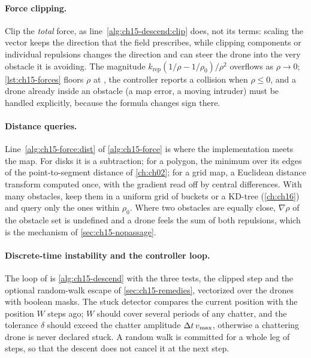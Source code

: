 \paragraph{Force clipping.}
Clip the \emph{total} force, as line~\ref{alg:ch15-descend:clip} does, not
its terms: scaling the vector keeps the direction that the field
prescribes, while clipping components or individual repulsions changes the
direction and can steer the drone into the very obstacle it is avoiding.
The magnitude $k_{\mathrm{rep}}(1/\rho - 1/\rho_0)/\rho^2$ overflows as
$\rho \to 0$; \cref{lst:ch15-forces} floors $\rho$ at , the
controller reports a collision when $\rho \le 0$, and a drone already inside
an obstacle (a map error, a moving intruder) must be handled explicitly,
because the formula changes sign there.

\paragraph{Distance queries.}
Line~\ref{alg:ch15-force:dist} of \cref{alg:ch15-force} is where the
implementation meets the map. For disks it is a subtraction; for a polygon,
the minimum over its edges of the point-to-segment distance of
\cref{ch:ch02}; for a grid map, a Euclidean distance transform computed
once, with the gradient read off by central differences. With many obstacles, keep them in a uniform
grid of buckets or a KD-tree (\cref{ch:ch16}) and query only the ones
within $\rho_0$. Where two obstacles are equally close, $\nabla\rho$ of the
obstacle set is undefined and a drone feels the sum of both repulsions,
which is the mechanism of \cref{sec:ch15-nopassage}.

\paragraph{Discrete-time instability and the controller loop.}
The loop of  is \cref{alg:ch15-descend} with the
three tests, the clipped step and the optional random-walk escape of
\cref{sec:ch15-remedies}, vectorized over the drones with boolean masks. The
stuck detector compares the current position with the position $W$ steps
ago; $W$ should cover several periods of any chatter, and the tolerance
$\delta$ should exceed the chatter amplitude $\Delta t\,v_{\max}$, otherwise a
chattering drone is never declared stuck. A random walk is committed for a
whole leg of steps, so that the descent does not cancel it at the next step.

